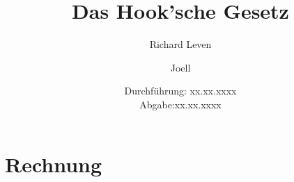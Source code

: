 \documentclass{scrartcl}
\title{Das Hook'sche Gesetz}
\author{Richard Leven \and Joell}
\date{
    Durchführung: xx.xx.xxxx\\
    Abgabe:xx.xx.xxxx
}
\begin{document}
\maketitle
\section{Rechnung}

\end{document}
